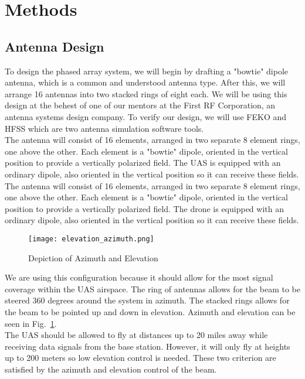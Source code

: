 \documentclass[UROP.tex]{subfiles}
\begin{document}
\bigskip
\section{\Large Methods}
\subsection{Antenna Design}

	To design the phased array system, we will begin by drafting a "bowtie" dipole antenna, which is a common and understood antenna type.  After this, we will arrange 16 antennas into two stacked rings of eight each.  We will be using this design at the behest of one of our mentors at the First RF Corporation, an antenna systems design company.  To verify our design, we will use FEKO and HFSS which are two antenna simulation software tools. \\

	The antenna will consist of 16 elements, arranged in two separate 8 element rings, one above the other.  Each element is a "bowtie" dipole, oriented in the vertical position to provide a vertically polarized field.  The UAS is equipped with an ordinary dipole, also oriented in the vertical position so it can receive these fields.  \\

	The antenna will consist of 16 elements, arranged in two separate 8 element rings, one above the other.  Each element is a "bowtie" dipole, oriented in the vertical position to provide a vertically polarized field.  The drone is equipped with an ordinary dipole, also oriented in the vertical position so it can receive these fields.  
	
	\begin{figure}[H]
		\centering
		\texttt{[image: elevation\_azimuth.png]}
		\caption{ Depiction of Azimuth and Elevation \label{fig:elevation_azimuth}}
	\end{figure}

	We are using this configuration because it should allow for the most signal coverage within the UAS airspace.  The ring of antennas allows for the beam to be steered 360 degrees around the system in azimuth.  The stacked rings allows for the beam to be pointed up and down in elevation.  Azimuth and elevation can be seen in Fig.~\ref{fig:elevation_azimuth}.  \\
	
	The UAS should be allowed to fly at distances up to 20 miles away while receiving data signals from the base station.  However, it will only fly at heights up to 200 meters so low elevation control is needed.  These two criterion are satisfied by the azimuth and elevation control of the beam.  \\
\end{document}
